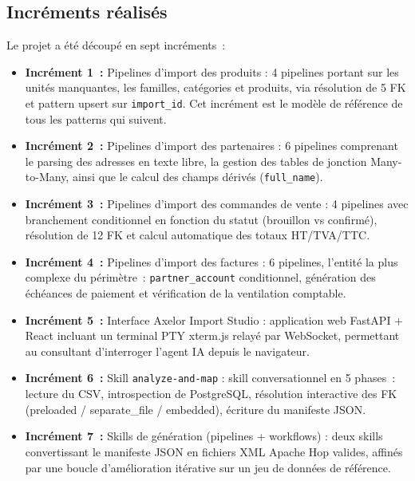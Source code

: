 \subsection{Incréments réalisés}

Le projet a été découpé en sept incréments~:

\begin{itemize}
  \item \textbf{Incrément 1~:} Pipelines d'import des produits : 4 pipelines portant sur les unités manquantes, les familles, catégories et produits, via résolution de 5 FK et pattern upsert sur \texttt{import\_id}. Cet incrément est le modèle de référence de tous les patterns qui suivent.

  \item \textbf{Incrément 2~:} Pipelines d'import des partenaires : 6 pipelines comprenant le parsing des adresses en texte libre, la gestion des tables de jonction Many-to-Many, ainsi que le calcul des champs dérivés (\texttt{full\_name}).

  \item \textbf{Incrément 3~:} Pipelines d'import des commandes de vente : 4 pipelines avec branchement conditionnel en fonction du statut (brouillon vs confirmé), résolution de 12 FK et calcul automatique des totaux HT/TVA/TTC.

  \item \textbf{Incrément 4~:} Pipelines d'import des factures : 6 pipelines, l'entité la plus complexe du périmètre~: \texttt{partner\_account} conditionnel, génération des échéances de paiement et vérification de la ventilation comptable.

  \item \textbf{Incrément 5~:} Interface Axelor Import Studio : application web FastAPI + React incluant un terminal PTY xterm.js relayé par WebSocket, permettant au consultant d'interroger l'agent IA depuis le navigateur.

  \item \textbf{Incrément 6~:} Skill \texttt{analyze-and-map} : skill conversationnel en 5 phases~: lecture du CSV, introspection de PostgreSQL, résolution interactive des FK (preloaded / separate\_file / embedded), écriture du manifeste JSON.

  \item \textbf{Incrément 7~:} Skills de génération (pipelines + workflows) : deux skills convertissant le manifeste JSON en fichiers XML Apache Hop valides, affinés par une boucle d'amélioration itérative sur un jeu de données de référence.
\end{itemize}

